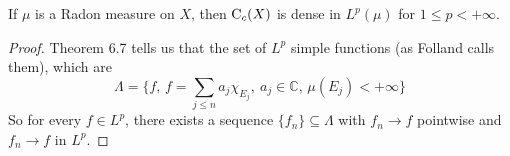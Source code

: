 \documentclass[../../main.tex]{subfiles}
\begin{document}
\begin{wts}
    If $\mu$ is a Radon measure on $X$, then $\operatorname{C}_c({X})$ is dense in $L^p(\mu)$ for $1\leq p<+\infty$.
\end{wts}
\begin{proof}
    Theorem 6.7 tells us that the set of $L^p$ simple functions (as Folland calls them), which are
    \[
        \Lambda=\biggl\{f,\,f=\sum_{j\leq n}a_j\chi_{E_j},\:a_j\in\mathbb{C},\,\mu(E_j)<+\infty\biggr\}
    \]
    So for every $f\in L^p$, there exists a sequence $\{f_n\}\subseteq\Lambda$ with $f_n\to f$ pointwise and $f_n\to f$ in $L^p$.
\end{proof}
\end{document}

